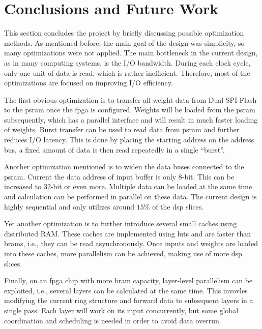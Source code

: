 
\chapter{Conclusions and Future Work}

This section concludes the project by briefly discussing possible optimization methods.
As mentioned before, the main goal of the design was simplicity, so many optimizations were not applied.
The main bottleneck in the current design, as in many computing systems, is the I/O bandwidth. During
each clock cycle, only one unit of data is read, which is rather inefficient. Therefore, most of the
optimizations are focused on improving I/O efficiency.

The first obvious optimization is to transfer all weight data from Dual-SPI Flash to the \gls{psram} once
the \gls{fpga} is configured. Weights will be loaded from the \gls{psram} subsequently, which has a parallel
interface and will result in much faster loading of weights.
Burst transfer can be used to read data from \gls{psram} and further reduces I/O latency. This is done by
placing the starting address on the address bus, a fixed amount of data is then read repeatedly in a single
``burst''.

Another optimization mentioned is to widen the data buses connected to the \gls{psram}. Current the
data address of input buffer is only 8-bit. This can be increased to 32-bit or even more. Multiple data
can be loaded at the same time and calculation can be performed in parallel on these data. The current
design is highly sequential and only utilizes around $15\%$ of the \gls{dsp} slices.

Yet another optimization is to further introduce several small caches using distributed RAM. These caches
are implemented using \glspl{lut} and are faster than \glspl{bram}, i.e., they can be read asynchronously.
Once inputs and weights are loaded into these caches, more parallelism can be achieved,
making use of more \gls{dsp} slices.

Finally, on an \gls{fpga} chip with more \gls{bram} capacity, layer-level parallelism can be exploited, i.e.,
several layers can be calculated at the same time. This invovles modifying the current ring structure and
forward data to subsequent layers in a single pass. Each layer will work on its input concurrently, but
some global coordination and scheduling is needed in order to avoid data overrun.

\clearpage %
